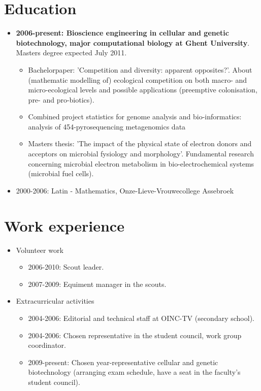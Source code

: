 \documentclass[a4paper,11pt,oneside]{article}
\begin{document}
\section{Education}
\begin{itemize}
\item \textbf{2006-present: Bioscience engineering in cellular and genetic biotechnology, major computational biology at Ghent University}. Masters degree expected July 2011.
	\begin{itemize}
		\item Bachelorpaper: 'Competition and diversity: apparent opposites?'. About (mathematic modelling of) ecological competition on both macro- and micro-ecological levels and possible applications (preemptive colonisation, pre- and pro-biotics).
		\item Combined project statistics for genome analysis and bio-informatics: analysis of 454-pyrosequencing metagenomics data
		\item Masters thesis: 'The impact of the physical state of electron donors and acceptors on microbial fysiology and morphology'. Fundamental research concerning microbial electron metabolism in bio-electrochemical systems (microbial fuel cells).
	\end{itemize}
\item 2000-2006: Latin - Mathematics, Onze-Lieve-Vrouwecollege Assebroek
\end{itemize}

\section{Work experience}
\begin{itemize}
\item Volunteer work
	\begin{itemize}
	\item 2006-2010: Scout leader.
	\item 2007-2009: Equiment manager in the scouts.
	\end{itemize}
\item Extracurricular activities
	\begin{itemize}
	\item 2004-2006: Editorial and technical staff at OINC-TV (secondary school). 
	\item 2004-2006: Chosen representative in the student council, work group coordinator.
	\item 2009-present: Chosen year-representative cellular and genetic biotechnology (arranging exam schedule, have a seat in the faculty's student council).
	\end{itemize}
\end{itemize}
\end{document}
